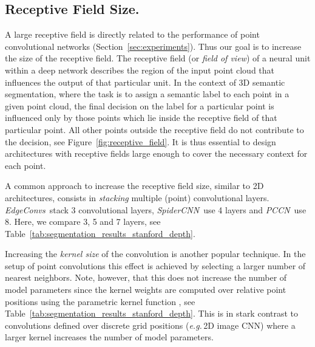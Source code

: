 \documentclass[letterpaper, 10 pt, conference]{ieeeconf}
\def\eg{\emph{e.g.}\,}
\newcommand{\refsec}[1]{Section~\ref{sec:#1}}
\newcommand{\reffig}[1]{Figure~\ref{fig:#1}}
\newcommand{\reftab}[1]{Table~\ref{tab:#1}}
\begin{document}
\subsection{Receptive Field Size.}
A large receptive field is directly related to the performance of point convolutional networks (\refsec{experiments}).
Thus our goal is to increase the size of the receptive field.
The receptive field (or \emph{field of view}) of a neural unit within a deep network describes the region of the input point cloud that influences the output of that particular unit.
In the context of 3D semantic segmentation, where the task is to assign a semantic label to each point in a given point cloud, the final decision on the label for a particular point is influenced only by those points which lie inside the receptive field of that particular point.
All other points outside the receptive field do not contribute to the decision, see \reffig{receptive_field}.
It is thus essential to design architectures with receptive fields large enough to cover the necessary context for each point.

A common approach to increase the receptive field size, similar to 2D architectures, consists in \emph{stacking} multiple (point) convolutional layers.
\emph{EdgeConvs}\,\cite{Wang18CoRR} stack 3 convolutional layers, \emph{SpiderCNN}\,\cite{Xu18ECCV} use 4 layers and \emph{PCCN}\,\cite{Wang18CVPRa} use 8.
Here, we compare 3, 5 and 7 layers, see \reftab{segmentation_results_stanford_depth}.

Increasing the \emph{kernel size} of the convolution is another popular technique.
In the setup of point convolutions this effect is achieved by selecting a larger number  of nearest neighbors.
Note, however, that this does not increase the number of model parameters since the kernel weights are computed over relative point positions using the parametric kernel function , see \reftab{segmentation_results_stanford_depth}.
This is in stark contrast to convolutions defined over discrete grid positions (\eg 2D image CNN) where a larger kernel increases the number of model parameters.
\end{document}
